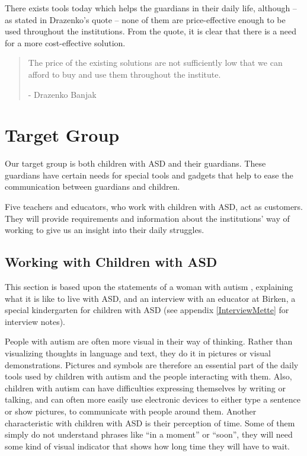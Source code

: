 There exists tools today which helps the guardians in their daily life, although -- as stated in Drazenko's quote -- none of them are price-effective enough to be used throughout the institutions. From the quote, it is clear that there is a need for a more cost-effective solution.

\begin{quotation}
The price of the existing solutions are not sufficiently low that we can afford to buy and use them throughout the institute.\\ 
	\begin{flushright}
		- Drazenko Banjak
	\end{flushright}
\end{quotation}\section{Target Group}
Our target group is both children with ASD and their guardians. These guardians have certain needs for special tools and gadgets that help to ease the communication between guardians and children.

Five teachers and educators, who work with children with ASD, act as customers. They will provide requirements and information about the institutions' way of working to give us an insight into their daily struggles.

\subsection{Working with Children with ASD}
This section is based upon the statements of a woman with autism \cite{autism.com}, explaining what it is like to live with ASD, and an interview with an educator at Birken, a special kindergarten for children with ASD (see appendix \ref{InterviewMette} for interview notes).

	People with autism are often more visual in their way of thinking. Rather than visualizing thoughts in language and text, they do it in pictures or visual demonstrations. Pictures and symbols are therefore an essential part of the daily tools used by children with autism and the people interacting with them. Also, children with autism can have difficulties expressing themselves by writing or talking, and can often more easily use electronic devices to either type a sentence or show pictures, to communicate with people around them.
	Another characteristic with children with ASD is their perception of time. Some of them simply do not understand phrases like "`in a moment"' or "`soon"', they will need some kind of visual indicator that shows how long time they will have to wait.

